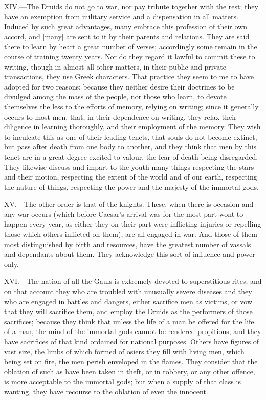 XIV.—The Druids do not go to war, nor pay tribute together with the
rest; they have an exemption from military service and a dispensation in
all matters. Induced by such great advantages, many embrace this
profession of their own accord, and [many] are sent to it by their
parents and relations. They are said there to learn by heart a great
number of verses; accordingly some remain in the course of training
twenty years. Nor do they regard it lawful to commit these to writing,
though in almost all other matters, in their public and private
transactions, they use Greek characters. That practice they seem to me
to have adopted for two reasons; because they neither desire their
doctrines to be divulged among the mass of the people, nor those who
learn, to devote themselves the less to the efforts of memory, relying
on writing; since it generally occurs to most men, that, in their
dependence on writing, they relax their diligence in learning
thoroughly, and their employment of the memory. They wish to inculcate
this as one of their leading tenets, that souls do not become extinct,
but pass after death from one body to another, and they think that men
by this tenet are in a great degree excited to valour, the fear of death
being disregarded. They likewise discuss and impart to the youth many
things respecting the stars and their motion, respecting the extent of
the world and of our earth, respecting the nature of things, respecting
the power and the majesty of the immortal gods.

XV.—The other order is that of the knights. These, when there is
occasion and any war occurs (which before Caesar's arrival was for the
most part wont to happen every year, as either they on their part were
inflicting injuries or repelling those which others inflicted on them),
are all engaged in war. And those of them most distinguished by birth
and resources, have the greatest number of vassals and dependants about
them. They acknowledge this sort of influence and power only.

XVI.—The nation of all the Gauls is extremely devoted to superstitious
rites; and on that account they who are troubled with unusually severe
diseases and they who are engaged in battles and dangers, either
sacrifice men as victims, or vow that they will sacrifice them, and
employ the Druids as the performers of those sacrifices; because they
think that unless the life of a man be offered for the life of a man,
the mind of the immortal gods cannot be rendered propitious, and they
have sacrifices of that kind ordained for national purposes. Others have
figures of vast size, the limbs of which formed of osiers they fill with
living men, which being set on fire, the men perish enveloped in the
flames. They consider that the oblation of such as have been taken in
theft, or in robbery, or any other offence, is more acceptable to the
immortal gods; but when a supply of that class is wanting, they have
recourse to the oblation of even the innocent.

